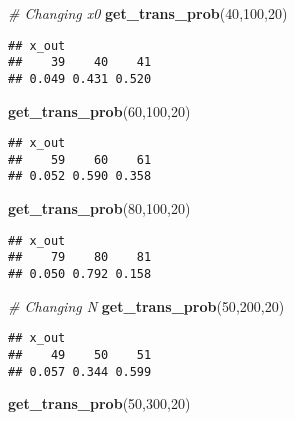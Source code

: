 \documentclass[
]{article}
\newenvironment{Shaded}{\begin{snugshade}}{\end{snugshade}}
\newcommand{\CommentTok}[1]{\textcolor[rgb]{0.56,0.35,0.01}{\textit{#1}}}
\newcommand{\DecValTok}[1]{\textcolor[rgb]{0.00,0.00,0.81}{#1}}
\newcommand{\FunctionTok}[1]{\textcolor[rgb]{0.13,0.29,0.53}{\textbf{#1}}}
\newcommand{\NormalTok}[1]{#1}
\begin{document}
\begin{Shaded}
\begin{Highlighting}[]
\CommentTok{\# Changing x0 }
\FunctionTok{get\_trans\_prob}\NormalTok{(}\DecValTok{40}\NormalTok{,}\DecValTok{100}\NormalTok{,}\DecValTok{20}\NormalTok{)}
\end{Highlighting}
\end{Shaded}

\begin{verbatim}
## x_out
##    39    40    41 
## 0.049 0.431 0.520
\end{verbatim}

\begin{Shaded}
\begin{Highlighting}[]
\FunctionTok{get\_trans\_prob}\NormalTok{(}\DecValTok{60}\NormalTok{,}\DecValTok{100}\NormalTok{,}\DecValTok{20}\NormalTok{)}
\end{Highlighting}
\end{Shaded}

\begin{verbatim}
## x_out
##    59    60    61 
## 0.052 0.590 0.358
\end{verbatim}

\begin{Shaded}
\begin{Highlighting}[]
\FunctionTok{get\_trans\_prob}\NormalTok{(}\DecValTok{80}\NormalTok{,}\DecValTok{100}\NormalTok{,}\DecValTok{20}\NormalTok{)}
\end{Highlighting}
\end{Shaded}

\begin{verbatim}
## x_out
##    79    80    81 
## 0.050 0.792 0.158
\end{verbatim}

\begin{Shaded}
\begin{Highlighting}[]
\CommentTok{\# Changing N}
\FunctionTok{get\_trans\_prob}\NormalTok{(}\DecValTok{50}\NormalTok{,}\DecValTok{200}\NormalTok{,}\DecValTok{20}\NormalTok{)}
\end{Highlighting}
\end{Shaded}

\begin{verbatim}
## x_out
##    49    50    51 
## 0.057 0.344 0.599
\end{verbatim}

\begin{Shaded}
\begin{Highlighting}[]
\FunctionTok{get\_trans\_prob}\NormalTok{(}\DecValTok{50}\NormalTok{,}\DecValTok{300}\NormalTok{,}\DecValTok{20}\NormalTok{)}
\end{Highlighting}
\end{Shaded}
\end{document}
